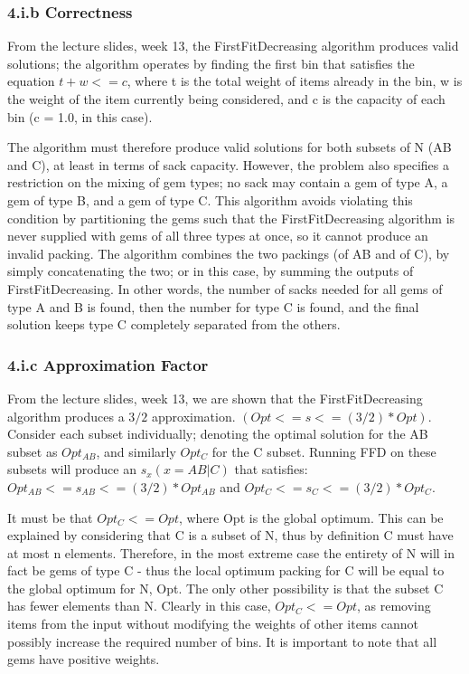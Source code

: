 \documentclass[paper=a4, fontsize=12pt]{article}
\begin{document}
\subsubsection{4.i.b Correctness}
From the lecture slides, week 13, the FirstFitDecreasing algorithm produces
valid solutions; the algorithm operates by finding the first bin that satisfies
the equation \(t + w <= c\), where t is the total weight of items already in
the bin, w is the weight of the item currently being considered, and c is the
capacity of each bin (c = 1.0, in this case).

The algorithm must therefore produce valid solutions for both subsets of N (AB
and C), at least in terms of sack capacity. However, the problem also specifies
a restriction on the mixing of gem types; no sack may contain a gem of type A,
a gem of type B, and a gem of type C. This algorithm avoids violating this
condition by partitioning the gems such that the FirstFitDecreasing algorithm
is never supplied with gems of all three types at once, so it cannot produce an
invalid packing. The algorithm combines the two packings (of AB and of C), by
simply concatenating the two; or in this case, by summing the outputs of
FirstFitDecreasing. In other words, the number of sacks needed for all gems of
type A and B is found, then the number for type C is found, and the final
solution keeps type C completely separated from the others.

\subsubsection{4.i.c Approximation Factor}
From the lecture slides, week 13, we are shown that the FirstFitDecreasing
algorithm produces a \(3/2\) approximation. \((Opt <= s <= (3/2) *
Opt)\). Consider each subset individually; denoting the optimal solution for
the AB subset as \(Opt_{AB}\), and similarly \(Opt_C\) for the C subset. Running FFD on
these subsets will produce an \(s_x (x = AB | C)\) that satisfies: \(Opt_{AB} <=
s_{AB} <= (3/2) * Opt_{AB}\) and \(Opt_C <= s_C <= (3/2) * Opt_C\).

It must be that \(Opt_C <= Opt\), where Opt is the global optimum. This can be
explained by considering that C is a subset of N, thus by definition C must
have at most n elements. Therefore, in the most extreme case the entirety of N
will in fact be gems of type C - thus the local optimum packing for C will be
equal to the global optimum for N, Opt. The only other possibility is that the
subset C has fewer elements than N. Clearly in this case, \(Opt_C <= Opt\), as
removing items from the input without modifying the weights of other items
cannot possibly increase the required number of bins. It is important to note
that all gems have positive weights.
\end{document}
